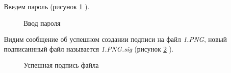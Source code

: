 \documentclass[10pt,a4paper]{report}
\begin{document}
Введем пароль (рисунок \ref{ris:image9} ).
\begin{figure}[h]
\caption{Ввод пароля}
\label{ris:image9}
\end{figure}

Видим сообщение об успешном создании подписи на файл \textit{1.PNG}, новый подписаннный файл называется \textit{1.PNG.sig} (рисунок \ref{ris:image10} ).
\begin{figure}[h]	
\caption{Успешная подпись файла}
\label{ris:image10}
\end{figure}
\end{document}
